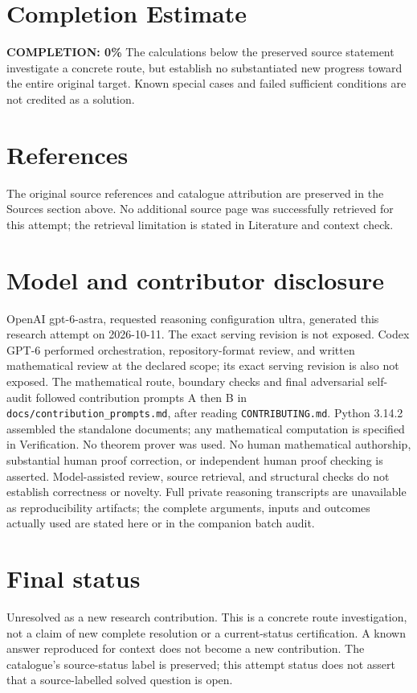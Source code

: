 \documentclass[11pt]{article}
\begin{document}
\section{Completion Estimate}
\noindent\textbf{COMPLETION: 0\%}
The calculations below the preserved source statement investigate a concrete route,
but establish no substantiated new progress toward the entire original target.
Known special cases and failed sufficient conditions are not credited as a solution.
\section{References}
The original source references and catalogue attribution are preserved in the
Sources section above. No additional source page was successfully retrieved for
this attempt; the retrieval limitation is stated in Literature and context check.
\section{Model and contributor disclosure}
OpenAI gpt-6-astra, requested reasoning configuration ultra, generated this research
attempt on 2026-10-11. The exact serving revision is not exposed. Codex GPT-6
performed orchestration, repository-format review, and written mathematical review at the declared scope; its exact serving revision
is also not exposed. The mathematical route, boundary checks and final adversarial
self-audit followed contribution prompts A then B in
\texttt{docs/contribution\_prompts.md}, after reading \texttt{CONTRIBUTING.md}.
Python 3.14.2 assembled the standalone documents; any mathematical computation is
specified in Verification. No theorem prover was used. No human mathematical
authorship, substantial human proof correction, or independent human proof checking
is asserted. Model-assisted review, source retrieval, and structural checks do not
establish correctness or novelty. Full private reasoning transcripts are unavailable
as reproducibility artifacts; the complete arguments, inputs and outcomes actually
used are stated here or in the companion batch audit.
\section{Final status}
Unresolved as a new research contribution. This is a concrete route investigation,
not a claim of new complete resolution or a current-status certification. A known
answer reproduced for context does not become a new contribution. The catalogue's
source-status label is preserved; this attempt status does not assert that a
source-labelled solved question is open.
\end{document}
